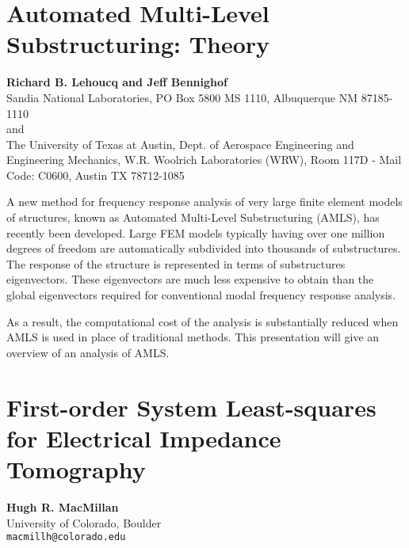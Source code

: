 \documentclass[11pt]{article}
\newcommand{\nextab}[4]{
	\section{#2}
	{\bf #1} \\ \nopagebreak
	{#3} \\ \nopagebreak
	{\tt #4} \nopagebreak
	}
\begin{document}
\nextab
{Richard B. Lehoucq and Jeff Bennighof}
{Automated Multi-Level Substructuring: Theory}
{Sandia National Laboratories,
PO Box 5800 MS 1110,
Albuquerque NM 87185-1110
\\ and \\
The University of Texas at Austin,
Dept. of Aerospace Engineering and Engineering Mechanics,
W.R. Woolrich Laboratories (WRW),
Room 117D - Mail Code: C0600,
Austin TX 78712-1085}
{}

A new method for frequency
response analysis of very large finite element models of structures,
known as Automated Multi-Level Substructuring (AMLS),
has recently been developed.
Large FEM models typically having over one million degrees of freedom are
automatically subdivided into thousands of substructures. The response of the
structure is represented in terms of substructures eigenvectors. These
eigenvectors are much less expensive to obtain than the global eigenvectors
required for conventional modal frequency response analysis.

As a result, the computational cost of the
analysis is substantially reduced when AMLS is used in place of traditional
methods.
This presentation will give an
overview of an analysis of AMLS.




\nextab
{Hugh R. MacMillan}
{First-order System Least-squares for Electrical Impedance Tomography}
{University of Colorado, Boulder}
{macmillh@colorado.edu}
\end{document}
